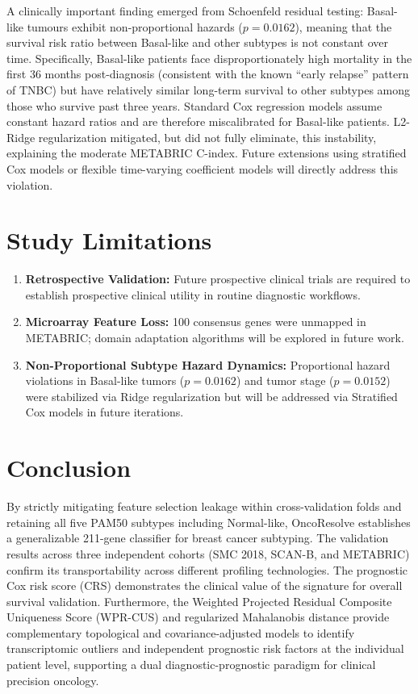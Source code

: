 \documentclass[10pt,a4paper,twocolumn]{article}
\begin{document}
A clinically important finding emerged from Schoenfeld residual testing: Basal-like tumours exhibit non-proportional hazards ($p = 0.0162$), meaning that the survival risk ratio between Basal-like and other subtypes is not constant over time. Specifically, Basal-like patients face disproportionately high mortality in the first 36 months post-diagnosis (consistent with the known ``early relapse'' pattern of TNBC) but have relatively similar long-term survival to other subtypes among those who survive past three years. Standard Cox regression models assume constant hazard ratios and are therefore miscalibrated for Basal-like patients. L2-Ridge regularization mitigated, but did not fully eliminate, this instability, explaining the moderate METABRIC C-index. Future extensions using stratified Cox models or flexible time-varying coefficient models will directly address this violation.

\section{Study Limitations}

\begin{enumerate}
    \item \textbf{Retrospective Validation:} Future prospective clinical trials are required to establish prospective clinical utility in routine diagnostic workflows.
    \item \textbf{Microarray Feature Loss:} 100 consensus genes were unmapped in METABRIC; domain adaptation algorithms will be explored in future work.
    \item \textbf{Non-Proportional Subtype Hazard Dynamics:} Proportional hazard violations in Basal-like tumors ($p=0.0162$) and tumor stage ($p=0.0152$) were stabilized via Ridge regularization but will be addressed via Stratified Cox models in future iterations.
\end{enumerate}

\section{Conclusion}

By strictly mitigating feature selection leakage within cross-validation folds and retaining all five PAM50 subtypes including Normal-like, OncoResolve establishes a generalizable 211-gene classifier for breast cancer subtyping. The validation results across three independent cohorts (SMC 2018, SCAN-B, and METABRIC) confirm its transportability across different profiling technologies. The prognostic Cox risk score (CRS) demonstrates the clinical value of the signature for overall survival validation. Furthermore, the Weighted Projected Residual Composite Uniqueness Score (WPR-CUS) and regularized Mahalanobis distance provide complementary topological and covariance-adjusted models to identify transcriptomic outliers and independent prognostic risk factors at the individual patient level, supporting a dual diagnostic-prognostic paradigm for clinical precision oncology.
\end{document}
